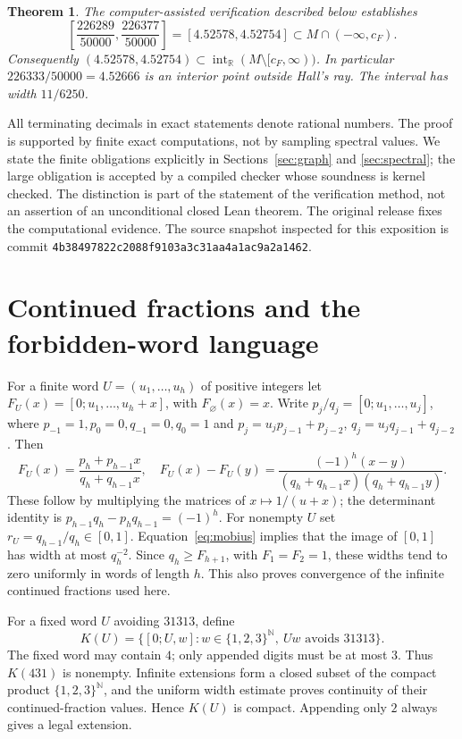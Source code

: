 \documentclass[11pt,a4paper]{article}
\newtheorem{theorem}{Theorem}[section]
\newcommand{\R}{\mathbb R}
\newcommand{\N}{\mathbb N}
\newcommand{\file}[1]{{\normalfont\small\nolinkurl{#1}}}
\begin{document}
\begin{theorem}\label{thm:main}
The computer-assisted verification described below establishes
\[
 \left[\frac{226289}{50000},\frac{226377}{50000}\right]
 =[4.52578,4.52754]\subset M\cap(-\infty,c_F).
\]
Consequently $(4.52578,4.52754)\subset\operatorname{int}_{\R}
(M\setminus[c_F,\infty))$. In particular $226333/50000=4.52666$ is an
interior point outside Hall's ray. The interval has width $11/6250$.
\end{theorem}
All terminating decimals in exact statements denote rational numbers.
The proof is supported by finite exact computations, not by sampling
spectral values. We state the finite obligations explicitly in
Sections~\ref{sec:graph} and \ref{sec:spectral}; the large obligation is
accepted by a compiled checker whose soundness is kernel checked.
The distinction is part of the statement of the verification method,
not an assertion of an unconditional closed Lean theorem.
The original release \cite{release} fixes the computational evidence.
The source snapshot inspected for this exposition is commit
\file{4b38497822c2088f9103a3c31aa4a1ac9a2a1462}.

\section{Continued fractions and the forbidden-word language}
For a finite word $U=(u_1,\ldots,u_h)$ of positive integers let
$F_U(x)=[0;u_1,\ldots,u_h+x]$, with $F_{\varnothing}(x)=x$.
Write $p_j/q_j=[0;u_1,\ldots,u_j]$, where
$p_{-1}=1,p_0=0,q_{-1}=0,q_0=1$ and
$p_j=u_jp_{j-1}+p_{j-2}$, $q_j=u_jq_{j-1}+q_{j-2}$.
Then
\begin{equation}\label{eq:mobius}
 F_U(x)=\frac{p_h+p_{h-1}x}{q_h+q_{h-1}x},\quad
 F_U(x)-F_U(y)=\frac{(-1)^h(x-y)}
 {(q_h+q_{h-1}x)(q_h+q_{h-1}y)}.
\end{equation}
These follow by multiplying the matrices of $x\mapsto1/(u+x)$;
the determinant identity is $p_{h-1}q_h-p_hq_{h-1}=(-1)^h$.
For nonempty $U$ set $r_U=q_{h-1}/q_h\in[0,1]$.
Equation~\eqref{eq:mobius} implies that the image of $[0,1]$ has width
at most $q_h^{-2}$. Since $q_h\ge F_{h+1}$, with
$F_1=F_2=1$, these widths tend to zero uniformly in words of length $h$.
This also proves convergence of the infinite continued fractions used here.

For a fixed word $U$ avoiding $31313$, define
\[
 K(U)=\{[0;U,w]: w\in\{1,2,3\}^{\N},\ Uw\text{ avoids }31313\}.
\]
The fixed word may contain $4$; only appended digits must be at most $3$.
Thus $K(431)$ is nonempty. Infinite extensions form a closed subset of the
compact product $\{1,2,3\}^{\N}$, and the uniform width estimate proves
continuity of their continued-fraction values. Hence $K(U)$ is compact.
Appending only $2$ always gives a legal extension.
\end{document}
